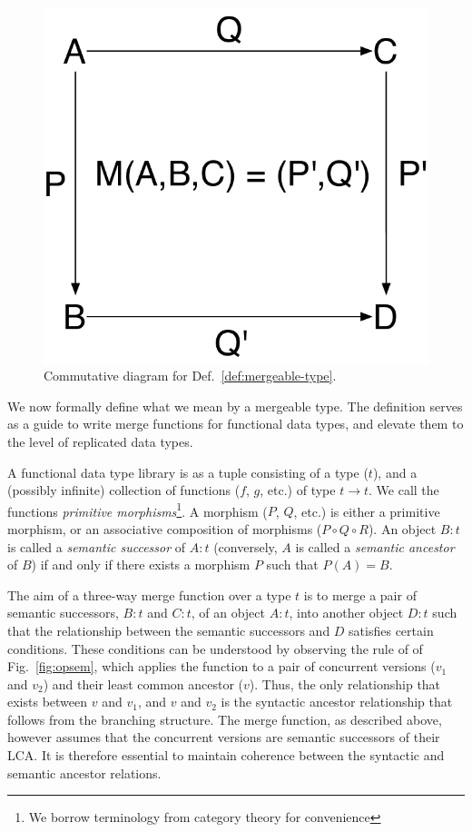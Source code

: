 \begin{figure}
\centering
\includegraphics[scale=0.4]{Figures/pushouts}

\caption{Commutative diagram for Def.~\ref{def:mergeable-type}.}
\label{fig:pushouts}
\end{figure}


We now formally define what we mean by a mergeable type. The
definition serves as a guide to write merge functions for functional
data types, and elevate them to the level of replicated data types.

A functional data type library is as a tuple consisting of a type
($t$), and a (possibly infinite) collection of functions ($f$, $g$,
etc.) of type $t \rightarrow t$. We call the functions \emph{primitive
morphisms}\footnote{We borrow terminology from category theory for
convenience}. A morphism ($P$, $Q$, etc.) is either a primitive
morphism, or an associative composition of morphisms ($P \circ Q \circ
R$). An object $B:t$ is called a \emph{semantic successor} of $A:t$
(conversely, $A$ is called a \emph{semantic ancestor} of $B$) if and
only if there exists a morphism $P$ such that $P(A) = B$.  

The aim of a three-way merge function over a type $t$ is to merge a
pair of semantic successors, $B:t$ and $C:t$, of an object $A:t$, into
another object $D:t$ such that the relationship between the semantic
successors and $D$ satisfies certain conditions. These conditions can
be understood by observing the  rule of of
Fig.~\ref{fig:opsem}, which applies the  function to a pair
of concurrent versions ($v_1$ and $v_2$) and their least common
ancestor ($v$). Thus, the only relationship that exists between $v$
and $v_1$, and $v$ and $v_2$ is the syntactic ancestor relationship
that follows from the branching structure. The merge function, as
described above, however assumes that the concurrent versions are
semantic successors of their LCA. It is therefore essential to
maintain coherence between the syntactic and semantic ancestor
relations.

